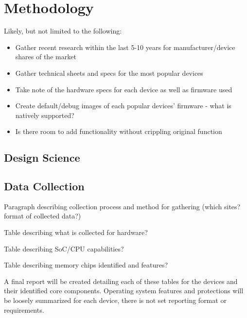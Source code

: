 \section{Methodology}
Likely, but not limited to the following:
\begin{itemize}
  \item Gather recent research within the last 5-10 years for manufacturer/device shares of the market
  \item Gather technical sheets and specs for the most popular devices
  \item Take note of the hardware specs for each device as well as firmware used
  \item Create default/debug images of each popular devices' firmware - what is natively supported?
  \item Is there room to add functionality without crippling original function
\end{itemize}


\subsection{Design Science}



\subsection{Data Collection}

Paragraph describing collection process and method for gathering (which sites? format of collected data?)

Table describing what is collected for hardware?

Table describing SoC/CPU capabilities?

Table describing memory chips identified and features?

A final report will be created detailing each of these tables for the devices and their identified core components. Operating system features and protections will be loosely summarized for each device, there is not set reporting format or requirements.
